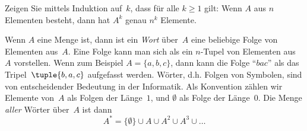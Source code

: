 \documentclass[../../../include/open-logic-section]{subfiles}
\begin{document}
\begin{prob}
Zeigen Sie mittels Induktion auf~$k$, dass für alle $k \ge 1$ gilt: Wenn $A$ aus $n$ Elementen besteht,
dann hat $A^k$ genau $n^k$ Elemente.
\end{prob}

\begin{ex}
Wenn $A$ eine Menge ist, dann ist ein \emph{Wort} über~$A$ eine beliebige Folge von Elementen
aus~$A$. Eine Folge kann man sich als ein $n$-Tupel von
Elementen aus~$A$ vorstellen. Wenn zum Beispiel $A = \{a, b, c\}$, dann kann die
Folge ``$bac$'' als das Tripel~$\tuple{b, a, c}$ aufgefasst werden.
Wörter, d.h. Folgen von Symbolen, sind von entscheidender Bedeutung in der
Informatik. Als Konvention zählen wir Elemente von~$A$ als
Folgen der Länge~$1$, und $\emptyset$ als Folge der Länge~$0$.
Die Menge \emph{aller} Wörter über~$A$ ist dann
\[
A^* = \{\emptyset\} \cup A \cup A^2 \cup A^3 \cup \dots
\]
\end{ex}
\end{document}
